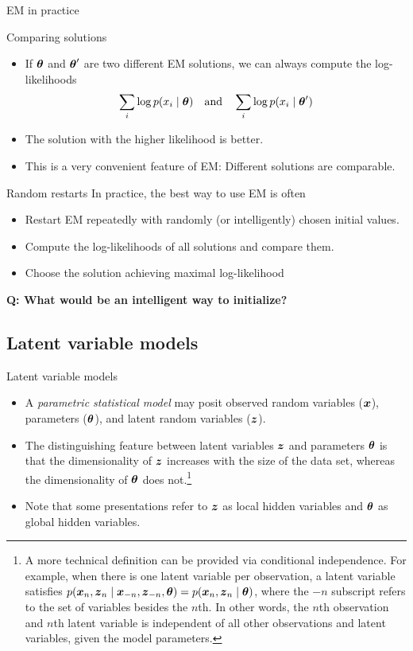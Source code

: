 \documentclass[10pt]{beamer}
\begin{document}
\begin{frame}{EM in practice}
\footnotesize
\begin{sblock}{Comparing solutions}
\begin{itemize}
\item If ${\boldsymbol \theta}$ and ${\boldsymbol \theta}^\prime$ are two different EM solutions, we can always compute the log-likelihoods
\[ \displaystyle\sum_i \log p(x_i \; | \; {\boldsymbol \theta}) \quad \text{and} \quad \displaystyle\sum_i \log p(x_i \; | \; {\boldsymbol \theta}^\prime) \]
\item The solution with the higher likelihood is better.
\item This is a very convenient feature of EM: Different solutions are comparable. 
\end{itemize}
\end{sblock}
\begin{sblock}{Random restarts}
In practice, the best way to use EM is often
\begin{itemize}
\item Restart EM repeatedly with randomly (or intelligently) chosen initial values.
\item Compute the log-likelihoods of all solutions and compare them.
\item Choose the solution achieving maximal log-likelihood
\end{itemize}
\end{sblock}
\vfill
\tiny \bf{Q}: What would be an intelligent way to initialize?
\end{frame}

\subsection{Latent variable models}
\begin{frame}{Latent variable models}

\begin{itemize}
\item A \textit{parametric statistical model} may posit observed random variables (${\boldsymbol x}$), parameters (${\boldsymbol \theta}$), and latent random variables (${\boldsymbol z}$).   
\item The distinguishing feature between latent variables ${\boldsymbol z}$ and parameters ${\boldsymbol \theta}$ is that the dimensionality of ${\boldsymbol z}$ increases with the size of the data set, whereas the dimensionality of ${\boldsymbol \theta}$ does not.\footnote{A more technical definition can be provided via conditional independence.  For example, when there is one latent variable per observation, a latent variable satisfies $p({\boldsymbol x}_n,{\boldsymbol z}_n \; | \; {\boldsymbol x}_{-n}, {\boldsymbol z}_{-n}, {\boldsymbol \theta}) = p({\boldsymbol x}_n,{\boldsymbol z}_n \; | \; {\boldsymbol \theta})$, where the $-n$ subscript refers to the set of variables besides the $n$th. In other words, the $n$th observation and $n$th latent variable is independent of all other observations and latent variables, given the model parameters.}  
\item 
 Note that some presentations refer to ${\boldsymbol z}$ as local hidden variables and ${\boldsymbol \theta}$ as global hidden variables.
\end{itemize}

\end{frame}
\end{document}
